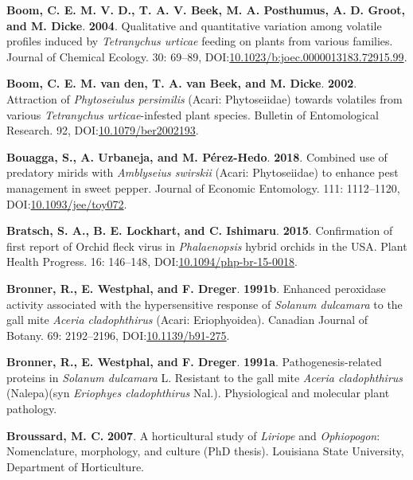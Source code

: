 \documentclass[12pt,final,CPage]{ufthesis}
\newlength{\cslhangindent}
\newenvironment{CSLReferences}[2] %
{%
	\setlength{\parindent}{0pt}
	\ifodd #1 \everypar{\setlength{\hangindent}{\cslhangindent}}\ignorespaces\fi
	\ifnum #2 > 0
	\setlength{\parskip}{#2\baselineskip}
	\fi
}%
{}
\begin{document}
{\begin{CSLReferences}{1}{0}
  \leavevmode{}%
  \textbf{Boom, C. E. M. V. D., T. A. V. Beek, M. A. Posthumus, A. D. Groot, and M. Dicke}. \textbf{2004}. Qualitative and quantitative variation among volatile profiles induced by {\emph{Tetranychus urticae}} feeding on plants from various families. Journal of Chemical Ecology. 30: 69--89, DOI:\href{https://doi.org/10.1023/b:joec.0000013183.72915.99}{10.1023/b:joec.0000013183.72915.99}.

  \leavevmode{}%
  \textbf{Boom, C. E. M. van den, T. A. van Beek, and M. Dicke}. \textbf{2002}. Attraction of {\emph{Phytoseiulus persimilis}} ({Acari}: {Phytoseiidae}) towards volatiles from various {\emph{Tetranychus urticae}}-infested plant species. Bulletin of Entomological Research. 92, DOI:\href{https://doi.org/10.1079/ber2002193}{10.1079/ber2002193}.

  \leavevmode{}%
  \textbf{Bouagga, S., A. Urbaneja, and M. Pérez-Hedo}. \textbf{2018}. Combined use of predatory mirids with {\emph{Amblyseius swirskii}} ({Acari}: {Phytoseiidae}) to enhance pest management in sweet pepper. Journal of Economic Entomology. 111: 1112--1120, DOI:\href{https://doi.org/10.1093/jee/toy072}{10.1093/jee/toy072}.

  \leavevmode{}%
  \textbf{Bratsch, S. A., B. E. Lockhart, and C. Ishimaru}. \textbf{2015}. Confirmation of first report of {Orchid fleck virus} in {\emph{Phalaenopsis}} hybrid orchids in the {USA}. Plant Health Progress. 16: 146--148, DOI:\href{https://doi.org/10.1094/php-br-15-0018}{10.1094/php-br-15-0018}.

  \leavevmode{}%
  \textbf{Bronner, R., E. Westphal, and F. Dreger}. \textbf{1991b}. Enhanced peroxidase activity associated with the hypersensitive response of {\emph{Solanum dulcamara}} to the gall mite {\emph{Aceria cladophthirus}} ({Acari}: {Eriophyoidea}). Canadian Journal of Botany. 69: 2192--2196, DOI:\href{https://doi.org/10.1139/b91-275}{10.1139/b91-275}.

  \leavevmode{}%
  \textbf{Bronner, R., E. Westphal, and F. Dreger}. \textbf{1991a}. Pathogenesis-related proteins in {\emph{Solanum dulcamara}} {L.} Resistant to the gall mite {\emph{Aceria cladophthirus}} ({Nalepa})(syn {\emph{Eriophyes cladophthirus}} {Nal.}). Physiological and molecular plant pathology.

  \leavevmode{}%
  \textbf{Broussard, M. C.} \textbf{2007}. A horticultural study of {\emph{Liriope}} and {\emph{Ophiopogon}}: Nomenclature, morphology, and culture (PhD thesis). Louisiana State University, Department of Horticulture.


\end{CSLReferences}}
\end{document}

